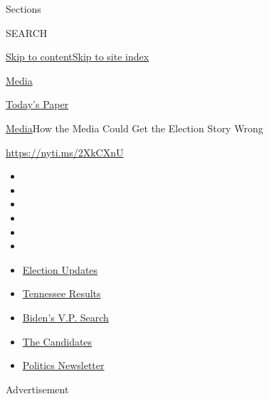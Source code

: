 Sections

SEARCH

\protect\hyperlink{site-content}{Skip to
content}\protect\hyperlink{site-index}{Skip to site index}

\href{https://www.nytimes.com/section/business/media}{Media}

\href{https://myaccount.nytimes.com/auth/login?response_type=cookie\&client_id=vi}{}

\href{https://www.nytimes.com/section/todayspaper}{Today's Paper}

\href{/section/business/media}{Media}\textbar{}How the Media Could Get
the Election Story Wrong

\href{https://nyti.ms/2XkCXnU}{https://nyti.ms/2XkCXnU}

\begin{itemize}
\item
\item
\item
\item
\item
\item
\end{itemize}

\begin{itemize}
\item
  \href{https://www.nytimes.com/2020/08/07/us/elections/biden-vs-trump.html?action=click\&pgtype=Article\&state=default\&region=TOP_BANNER\&context=storylines_menu}{Election
  Updates}
\item
  \href{https://www.nytimes.com/interactive/2020/08/06/us/elections/results-tennessee-primary-elections.html?action=click\&pgtype=Article\&state=default\&region=TOP_BANNER\&context=storylines_menu}{Tennessee
  Results}
\item
  \href{https://www.nytimes.com/article/biden-vice-president-2020.html?action=click\&pgtype=Article\&state=default\&region=TOP_BANNER\&context=storylines_menu}{Biden's
  V.P. Search}
\item
  \href{https://www.nytimes.com/interactive/2019/us/politics/2020-presidential-candidates.html?action=click\&pgtype=Article\&state=default\&region=TOP_BANNER\&context=storylines_menu}{The
  Candidates}
\item
  \href{https://www.nytimes.com/newsletters/politics?action=click\&pgtype=Article\&state=default\&region=TOP_BANNER\&context=storylines_menu}{Politics
  Newsletter}
\end{itemize}

Advertisement

